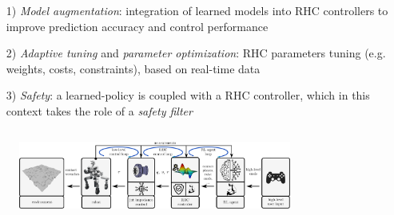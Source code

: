 \begin{columns}[t]

	\begin{Large}
	
	\begin{column}{0.4\textwidth}
		
		\begin{itemize}
			\item[1)] \textit{Model augmentation}: integration of learned models into RHC controllers to improve prediction accuracy and control performance
			\item[2)] \textit{Adaptive tuning} and \textit{parameter optimization}: RHC parameters tuning (e.g. weights, costs, constraints), based on real-time data
			\item[3)] \textit{Safety}: a learned-policy is coupled with a RHC controller, which in this context takes the role of a \textit{safety filter}
		\end{itemize}
		\vspace{10cm}

	\end{column}

	\begin{column}{0.6\textwidth}
		\begin{figure}[h]
			\includegraphics[width=0.8\textwidth]{docs/imgs/approach.png}
		\end{figure}
		\vspace{10cm}
		
	\end{column}
	\end{Large}
\end{columns}